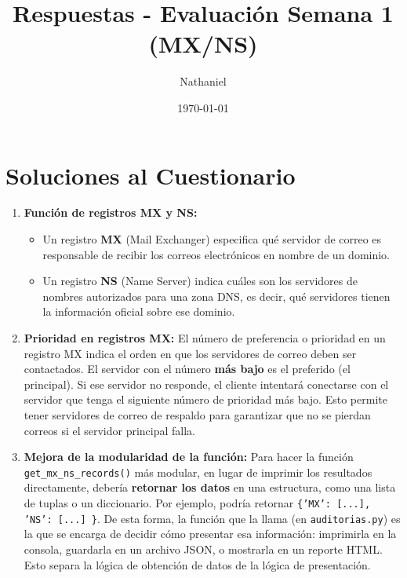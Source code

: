 \documentclass{article}
\title{Respuestas - Evaluación Semana 1 (MX/NS)}
\author{Nathaniel}
\date{\today}
\begin{document}
\maketitle

\section*{Soluciones al Cuestionario}

\begin{enumerate}
    \item \textbf{Función de registros MX y NS:}
    \begin{itemize}
        \item Un registro \textbf{MX} (Mail Exchanger) especifica qué servidor de correo es responsable de recibir los correos electrónicos en nombre de un dominio.
        \item Un registro \textbf{NS} (Name Server) indica cuáles son los servidores de nombres autorizados para una zona DNS, es decir, qué servidores tienen la información oficial sobre ese dominio.
    \end{itemize}

    \item \textbf{Prioridad en registros MX:}
    El número de preferencia o prioridad en un registro MX indica el orden en que los servidores de correo deben ser contactados. El servidor con el número \textbf{más bajo} es el preferido (el principal). Si ese servidor no responde, el cliente intentará conectarse con el servidor que tenga el siguiente número de prioridad más bajo. Esto permite tener servidores de correo de respaldo para garantizar que no se pierdan correos si el servidor principal falla.

    \item \textbf{Mejora de la modularidad de la función:}
    Para hacer la función \texttt{get\_mx\_ns\_records()} más modular, en lugar de imprimir los resultados directamente, debería \textbf{retornar los datos} en una estructura, como una lista de tuplas o un diccionario. Por ejemplo, podría retornar \texttt{\{'MX': [...], 'NS': [...] \}}. De esta forma, la función que la llama (en \texttt{auditorias.py}) es la que se encarga de decidir cómo presentar esa información: imprimirla en la consola, guardarla en un archivo JSON, o mostrarla en un reporte HTML. Esto separa la lógica de obtención de datos de la lógica de presentación.

\end{enumerate}
\end{document}

